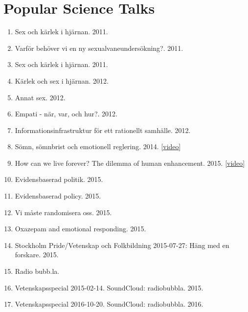 \documentclass[10pt,a4paper,twocolumn]{article}
\begin{document}
\section{Popular Science Talks}
\begin{enumerate}

    \item Sex och kärlek i hjärnan. 2011.

    \item Varför behöver vi en ny sexualvaneundersökning?. 2011.

    \item Sex och kärlek i hjärnan. 2011.

    \item Kärlek och sex i hjärnan. 2012.

    \item Annat sex. 2012.

    \item Empati - när, var, och hur?. 2012.

    \item Informationsinfrastruktur för ett rationellt samhälle. 2012.

    \item Sömn, sömnbrist och emotionell reglering. 2014. [\href{https://www.youtube.com/watch?v=wq2C_KNrn-8}{video}]

    \item How can we live forever? The dilemma of human enhancement. 2015. [\href{https://www.youtube.com/watch?v=74irIhJVKK8\&index=32\&list=PLvm-fAk-DoHVR6aWtbjW3oX9J7\_3KIhH3}{video}]

    \item Evidensbaserad politik. 2015.

    \item Evidensbaserad policy. 2015.

    \item Vi måste randomisera oss. 2015.

    \item Oxazepam and emotional responding. 2015.

    \item Stockholm Pride/Vetenskap och Folkbildning 2015-07-27: Häng med en forskare. 2015.

    \item Radio bubb.la.

    \item Vetenskapsspecial 2015-02-14. SoundCloud: radiobubbla. 2015.

    \item Vetenskapsspecial 2016-10-20. SoundCloud: radiobubbla. 2016.


\end{enumerate}
\end{document}

